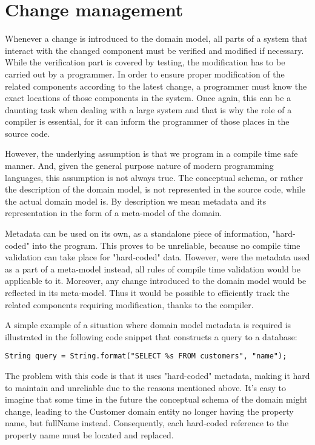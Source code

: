\section{Change management}

Whenever a change is introduced to the domain model, all parts of a system that interact with the changed component must be verified and modified if necessary. While the verification part is covered by testing, the modification has to be carried out by a programmer. In order to ensure proper modification of the related components according to the latest change, a programmer must know the exact locations of those components in the system. Once again, this can be a daunting task when dealing with a large system and that is why the role of a compiler is essential, for it can inform the programmer of those places in the source code.

\n

However, the underlying assumption is that we program in a compile time safe manner. And, given the general purpose nature of modern programming languages, this assumption is not always true. The conceptual schema, or rather the description of the domain model, is not represented in the source code, while the actual domain model is. By description we mean metadata and its representation in the form of a meta-model of the domain.

\n

Metadata can be used on its own, as a standalone piece of information, "hard-coded" into the program. This proves to be unreliable, because no compile time validation can take place for "hard-coded" data. However, were the metadata used as a part of a meta-model instead, all rules of compile time validation would be applicable to it. Moreover, any change introduced to the domain model would be reflected in its meta-model. Thus it would be possible to efficiently track the related components requiring modification, thanks to the compiler.


\n

A simple example of a situation where domain model metadata is required is illustrated in the following code snippet that constructs a query to a database:

\begin{verbatim}
String query = String.format("SELECT %s FROM customers", "name");
\end{verbatim}

The problem with this code is that it uses "hard-coded" metadata, making it hard to maintain and unreliable due to the reasons mentioned above. It’s easy to imagine that some time in the future the conceptual schema of the domain might change, leading to the Customer domain entity no longer having the property name, but fullName instead. Consequently, each hard-coded reference to the property name must be located and replaced.

